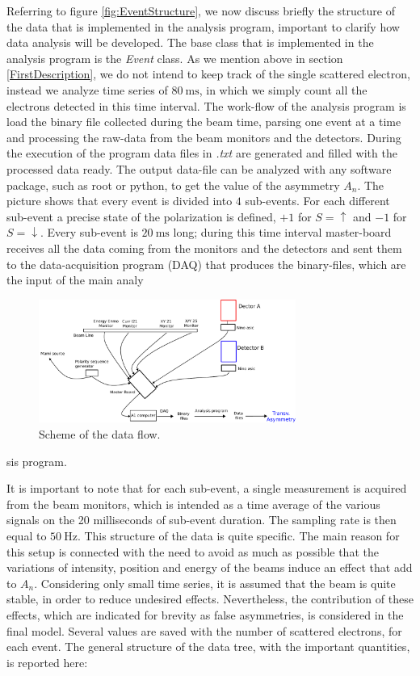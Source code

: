 Referring to figure \ref{fig:EventStructure}, we now discuss briefly the structure of the data that is implemented in the analysis program, important to clarify how data analysis will be developed.
The base class that is implemented in the analysis program is the \textit{Event} class. As we mention above in section \ref{FirstDescription}, we do not intend to keep track of the single scattered electron, instead we analyze time series of $\SI{80}{\milli \second}$, in which we simply count all the electrons detected in this time interval. The work-flow of the analysis program is load the binary file collected during the beam time, parsing  one event at a time and processing the raw-data from the beam monitors and the detectors. During the execution of the program data files in \textit{.txt} are generated and filled with the processed data ready. The output data-file can be analyzed with any software package, such as root or python, to get the value of the asymmetry $A_{n}$. 
The picture shows that every event is divided into $4$ sub-events. For each different sub-event a precise state of the polarization is defined, 
$+1$ for $S = \uparrow$ and $-1$ for $S = \downarrow$. Every sub-event is $\SI{20}{\milli \second}$ long; during this time interval master-board receives all the data coming from the monitors and the detectors and sent them to the data-acquisition program (DAQ) that produces the binary-files, which are the input of the main analy\begin{figure}[hbtp]

\centering
\includegraphics[width = 0.75\textwidth]{Analysis/Electronic_scheme.pdf}
\caption{Scheme of the data flow.}
\end{figure}
sis program.

 It is important to note that for each sub-event, a single measurement is acquired from the beam monitors, which is intended as a time average of the various signals on the 20 milliseconds of sub-event duration. The sampling rate is then equal to $\SI{50}{\hertz}$.
This structure of the data is quite specific. The main reason for this setup is connected with the need to avoid as much as possible that the variations of intensity, position and energy of the beams induce an effect that add to $A_{n}$. Considering only small time series, it is assumed that the beam is quite stable, in order to reduce undesired effects.
Nevertheless, the contribution of these effects, which are indicated for brevity as false asymmetries, is considered in the final model.
Several values are saved with the number of scattered electrons, for each event. The general structure of the data tree, with the important quantities, is reported here:

